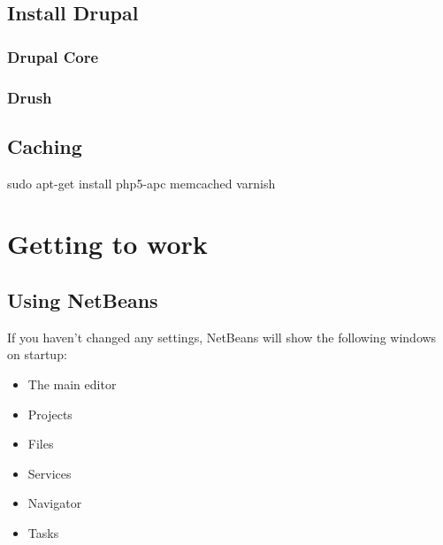 \documentclass[draft,ebook,10pt,twoside,openright]{memoir}
\begin{document}
\chapter{Install Drupal} \label{chinstalldrupal}

\section{Drupal Core}

\section{Drush}

\chapter{Caching} \label{chcaching}

\begin{squashboxcommand}
sudo apt-get install php5-apc memcached varnish
\end{squashboxcommand}

\part{Getting to work}

\chapter{Using NetBeans} \label{chusingnetbeans}
\chapterprecis{}

If you haven’t changed any settings, NetBeans will show the following windows on startup:


\begin{itemize}
\item The main editor
\item Projects
\item Files
\item Services
\item Navigator
\item Tasks
\end{itemize}
\end{document}
